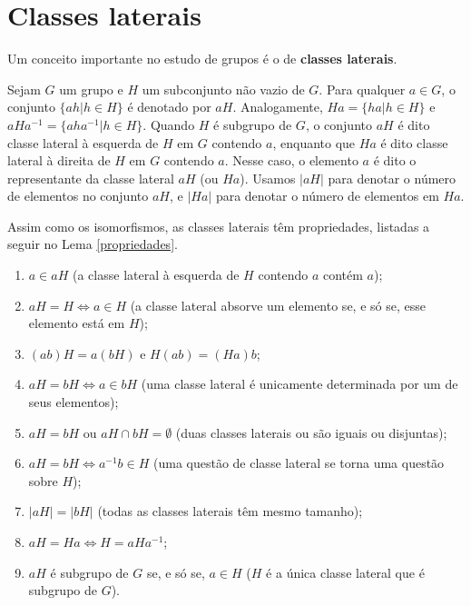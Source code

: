 \section{Classes laterais}
\label{sec-classes-laterais}

    \hspace{12pt} Um conceito importante no estudo de grupos é o de \textbf{classes laterais}.
	\begin{deff}
		\label{def classes laterais}
		Sejam $G$ um grupo e $H$ um subconjunto não vazio de $G$. Para qualquer $a\in G$,	o conjunto $\{ah | h \in H \}$ é denotado por $aH$. Analogamente, $Ha = \{ha | h \in H\}$
		e $aHa^{-1} = \{aha^{-1} | h \in H\}$. Quando $H$ é subgrupo de $G$, o conjunto $aH$ é dito classe lateral à esquerda de $H$ em $G$ contendo $a$, enquanto que $Ha$ é dito classe lateral à direita de $H$ em $G$ contendo $a$. Nesse caso, o elemento $a$ é dito o representante da classe lateral $aH$ (ou $Ha$). Usamos $|aH|$ para denotar o número de elementos no conjunto $aH$, e $|Ha|$ para denotar o número de elementos em $Ha$.
	\end{deff}
	\par\vspace{0.3cm} Assim como os isomorfismos, as classes laterais têm propriedades, listadas a seguir no Lema \eqref{propriedades}.
	\begin{lemma}
		\label{propriedades}
		\begin{enumerate}
			\item $a\in aH$ (a classe lateral à esquerda de $H$ contendo $a$ contém $a$); 
			\item $aH = H \Leftrightarrow a\in H$ (a classe lateral absorve um elemento se, e só se, esse elemento está em $H$);
			\item $(ab)H = a(bH)$ e $H(ab) = (Ha)b$;
			\item $aH = bH \Leftrightarrow a\in bH$ (uma classe lateral é unicamente determinada por um de seus elementos);
			\item $aH = bH$ ou $aH \cap bH = \emptyset$ (duas classes laterais ou são iguais ou disjuntas);
			\item $aH = bH \Leftrightarrow a^{-1}b\in H$ (uma questão de classe lateral se torna uma questão sobre $H$);
			\item $|aH| = |bH|$ (todas as classes laterais têm mesmo tamanho);
			\item $aH = Ha \Leftrightarrow H = aHa^{-1}$;
			\item $aH$ é subgrupo de $G$ se, e só se, $a\in H$ ($H$ é a única classe lateral que é subgrupo de $G$).
		\end{enumerate}	
	\end{lemma}
